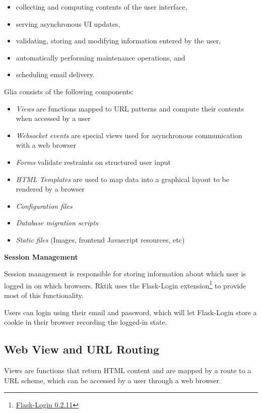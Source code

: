 \begin{itemize}
\tightlist
\item
  collecting and computing contents of the user interface,
\item
  serving asynchronous UI updates,
\item
  validating, storing and modifying information entered by the user,
\item
  automatically performing maintenance operations, and
\item
  scheduling email delivery.
\end{itemize}

Glia consists of the following components:

\begin{itemize}
\tightlist
\item
  \emph{Views} are functions mapped to URL patterns and compute their
  contents when accessed by a user
\item
  \emph{Websocket events} are special views used for asynchronous
  communication with a web browser
\item
  \emph{Forms} validate restraints on structured user input
\item
  \emph{HTML Templates} are used to map data into a graphical layout to
  be rendered by a browser
\item
  \emph{Configuration files}
\item
  \emph{Database migration scripts}
\item
  \emph{Static files} (Images, frontend Javascript resources, etc)
\end{itemize}

\textbf{Session Management}

Session management is responsible for storing information about which
user is logged in on which browsers. Rktik uses the Flask-Login
extension\footnote{\href{https://pypi.python.org/pypi/Flask-Login/0.2.11}{Flask-Login
  0.2.11}} to provide most of this functionality.

Users can login using their email and password, which will let
Flask-Login store a cookie in their browser recording the logged-in
state.

\subsection{Web View and URL Routing}\label{web-view-and-url-routing}

Views are functions that return HTML content and are mapped by a route
to a URL scheme, which can be accessed by a user through a web browser.

